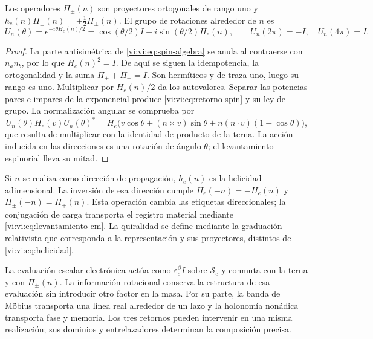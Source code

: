 \begin{proposition}
\label{vi:vi:prop:helicidad}
Los operadores $\Pi_\pm(n)$ son proyectores ortogonales de
rango uno y $h_e(n)\Pi_\pm(n)=\pm\tfrac12\Pi_\pm(n)$.
El grupo de rotaciones alrededor de $n$ es
\begin{equation}
 U_n(\theta)=e^{-i\theta H_e(n)/2}
 =\cos(\theta/2)I-i\sin(\theta/2)H_e(n),\qquad
 U_n(2\pi)=-I,\quad U_n(4\pi)=I.
 \label{vi:vi:eq:retorno-spin}
\end{equation}
\end{proposition}
\begin{proof}
La parte antisimétrica de \eqref{vi:vi:eq:spin-algebra} se anula
al contraerse con $n_an_b$, por lo que $H_e(n)^2=I$.
De aquí se siguen la idempotencia, la ortogonalidad y la suma
$\Pi_++\Pi_-=I$. Son hermíticos y de traza uno, luego su
rango es uno. Multiplicar por $H_e(n)/2$ da los autovalores.
Separar las potencias pares e impares de la exponencial produce
\eqref{vi:vi:eq:retorno-spin} y su ley de grupo. La normalización
angular se comprueba por
\[
 U_n(\theta)H_e(v)U_n(\theta)^*
 =H_e\bigl(v\cos\theta+(n\times v)\sin\theta
       +n(n\cdot v)(1-\cos\theta)\bigr),
\]
que resulta de multiplicar con la identidad de producto de la
terna. La acción inducida en las direcciones es una rotación de
ángulo $\theta$; el levantamiento espinorial lleva su mitad.
\end{proof}

Si $n$ se realiza como dirección de propagación, $h_e(n)$ es
la helicidad adimensional. La inversión de esa dirección cumple
$H_e(-n)=-H_e(n)$ y $\Pi_\pm(-n)=\Pi_\mp(n)$.
Esta operación cambia las etiquetas direccionales; la conjugación
de carga transporta el registro material mediante
\eqref{vi:vi:eq:levantamiento-cm}. La quiralidad se define mediante
la graduación relativista que corresponda a la representación y
sus proyectores, distintos de \eqref{vi:vi:eq:helicidad}.

La evaluación escalar electrónica actúa como
$\varepsilon_e^\beta I$ sobre $\mathscr S_e$ y conmuta con
la terna y con $\Pi_\pm(n)$. La información rotacional conserva
la estructura de esa evaluación sin introducir otro factor en
la masa. Por su parte, la banda de Möbius transporta una línea
real alrededor de un lazo y la holonomía nonádica transporta
fase y memoria. Los tres retornos pueden intervenir en una
misma realización; sus dominios y entrelazadores determinan la
composición precisa.
